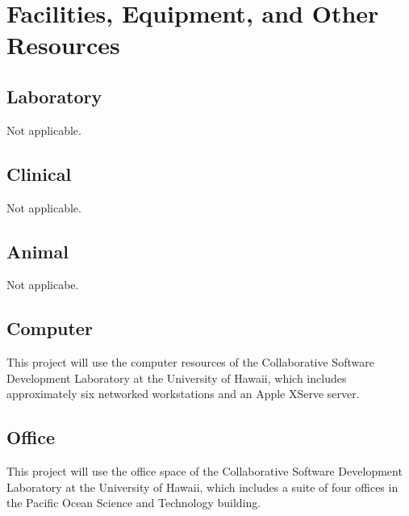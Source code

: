\documentclass{proposalnsf}
\begin{document}
\section*{Facilities, Equipment, and Other Resources}


\subsection*{Laboratory}

Not applicable.

\subsection*{Clinical}

Not applicable.

\subsection*{Animal}

Not applicabe.

\subsection*{Computer}

This project will use the computer resources of the Collaborative Software
Development Laboratory at the University of Hawaii, which includes
approximately six networked workstations and an Apple XServe server.

\subsection*{Office}

This project will use the office space of the Collaborative Software
Development Laboratory at the University of Hawaii, which includes a suite
of four offices in the Pacific Ocean Science and Technology building.
\end{document}

